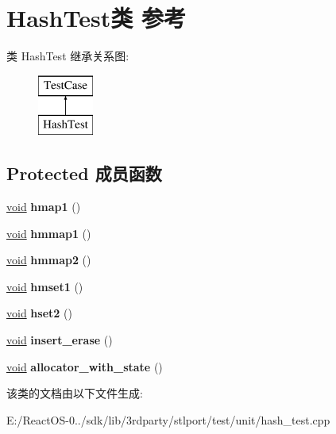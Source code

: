 \hypertarget{class_hash_test}{}\section{Hash\+Test类 参考}
\label{class_hash_test}
类 Hash\+Test 继承关系图\+:\begin{figure}[H]
\begin{center}
\leavevmode
\includegraphics[height=2.000000cm]{class_hash_test}
\end{center}
\end{figure}
\subsection*{Protected 成员函数}
\begin{DoxyCompactItemize}
\item 
\mbox{\label{class_hash_test_a0ce3e5c202ca1bee3cd6decd6e7d3470}} 
\hyperlink{interfacevoid}{void} {\bfseries hmap1} ()
\item 
\mbox{\label{class_hash_test_a283d38426d80acd046e07f187414004b}} 
\hyperlink{interfacevoid}{void} {\bfseries hmmap1} ()
\item 
\mbox{\label{class_hash_test_a78aa1b82b2507b9334de6361a1d6ed45}} 
\hyperlink{interfacevoid}{void} {\bfseries hmmap2} ()
\item 
\mbox{\label{class_hash_test_ac926960a16bdc161a99b419ac821bcbd}} 
\hyperlink{interfacevoid}{void} {\bfseries hmset1} ()
\item 
\mbox{\label{class_hash_test_a907f84828a41a89d5b295885537aefd1}} 
\hyperlink{interfacevoid}{void} {\bfseries hset2} ()
\item 
\mbox{\label{class_hash_test_a769e583f75782fadbfc4c121176a9205}} 
\hyperlink{interfacevoid}{void} {\bfseries insert\+\_\+erase} ()
\item 
\mbox{\label{class_hash_test_adc77c087fb3ad9a89be860e1f9241378}} 
\hyperlink{interfacevoid}{void} {\bfseries allocator\+\_\+with\+\_\+state} ()
\end{DoxyCompactItemize}


该类的文档由以下文件生成\+:\begin{DoxyCompactItemize}
\item 
E\+:/\+React\+O\+S-\/0../sdk/lib/3rdparty/stlport/test/unit/hash\+\_\+test.\+cpp\end{DoxyCompactItemize}
